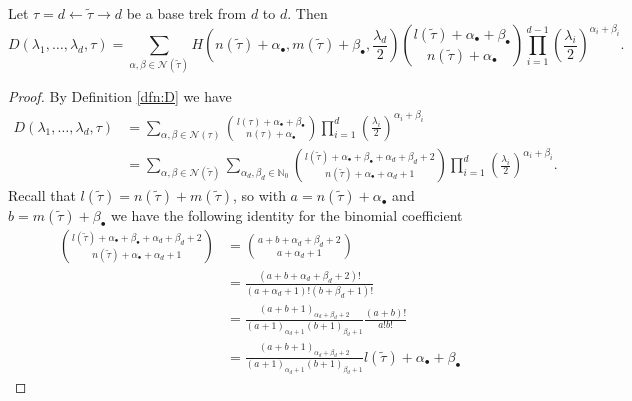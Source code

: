 \documentclass[10pt,twoside,a4paper]{amsart}
\begin{document}
\begin{proposition} \label{prop:Drep}
    Let $\tau = d \leftarrow \tilde{\tau} \rightarrow d$ be a base trek from 
    $d$ to $d$. Then
    {\small
    \begin{equation*}
        D(\lambda_1, \ldots, \lambda_{d}, \tau)  
        = \sum_{\alpha, \beta \in \mathcal{N}(\tilde{\tau})} 
        H\left(n(\tilde{\tau}) + \alpha_{\bullet}, m(\tilde{\tau}) + \beta_{\bullet}, \frac{\lambda_d}{2}\right) 
        {l(\tilde{\tau}) + \alpha_{\bullet} + \beta_{\bullet}
        \choose n(\tilde{\tau}) + \alpha_{\bullet}}
        \prod_{i=1}^{d-1} \left(\frac{\lambda_i}{2}\right)^{\alpha_i + \beta_i}. 
    \end{equation*}
    }
\end{proposition}

\begin{proof} By Definition \ref{dfn:D} we have
\begin{align*}
    D(\lambda_1, \ldots, \lambda_{d}, \tau)  & = 
    \sum_{\alpha, \beta \in \mathcal{N}(\tau)}
    {l(\tau) + \alpha_{\bullet} + \beta_{\bullet} \choose n(\tau) + \alpha_{\bullet}}
    \prod_{i=1}^d \left(\frac{\lambda_i}{2}\right)^{\alpha_i + \beta_i} \\
    & = \sum_{\alpha, \beta \in \mathcal{N}(\tilde{\tau})} \sum_{\alpha_d, \beta_d \in \mathbb{N}_0}
    {l(\tilde{\tau}) + \alpha_{\bullet} + \beta_{\bullet} + \alpha_d + \beta_d + 2
    \choose n(\tilde{\tau}) + \alpha_{\bullet} + \alpha_d + 1}
    \prod_{i=1}^{d} \left(\frac{\lambda_i}{2}\right)^{\alpha_i + \beta_i}. 
\end{align*}
Recall that $l(\tilde{\tau}) = n(\tilde{\tau}) + m(\tilde{\tau})$, so with $a = n(\tilde{\tau}) + \alpha_\bullet$ 
and $b = m(\tilde{\tau}) + \beta_\bullet$ we have the following identity for the 
binomial coefficient 
\begin{align*}
    {l(\tilde{\tau}) + \alpha_{\bullet} + \beta_{\bullet} + \alpha_d + \beta_d + 2
    \choose n(\tilde{\tau}) + \alpha_{\bullet} + \alpha_d + 1} & = 
    {a + b + \alpha_d + \beta_d + 2 \choose a + \alpha_d + 1} \\
    & = \frac{(a + b + \alpha_d + \beta_d + 2)!}{(a + \alpha_d + 1)!(b + \beta_d + 1)!} \\
    & = \frac{(a + b + 1)_{\alpha_d + \beta_d + 2}}{(a + 1)_{\alpha_d + 1}(b + 1)_{\beta_d + 1}}
    \frac{(a + b)!}{a!b!} \\
    & = \frac{(a + b + 1)_{\alpha_d + \beta_d + 2}}{(a + 1)_{\alpha_d + 1}(b + 1)_{\beta_d + 1}}
    {l(\tilde{\tau}) + \alpha_{\bullet} + \beta_{\bullet}
}
\end{align*}
\end{proof}
\end{document}
